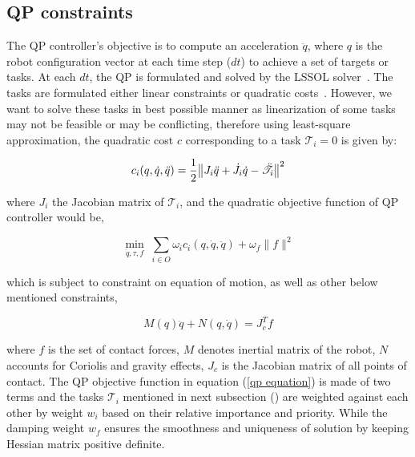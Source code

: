 \subsection{QP constraints}\label{QPConstraints}

The QP controller's objective is to compute an acceleration $\ddot{q}$, where $q$ is the robot configuration vector at each time step ($dt$)  to achieve a set of targets or tasks. At each $dt$, the QP is formulated and solved by the LSSOL solver~\cite{gill1986fortran}. The tasks are formulated either linear constraints or quadratic costs~\cite{ladder-HRP-2Kai}. However, we want to solve these tasks in best possible manner as linearization of some tasks may not be feasible or may be conflicting, therefore using least-square approximation, the quadratic cost $c$ corresponding to a task $\mathscr{T}_i =0$ is given by:



\begin{equation}
c_i(q,\dot{q}, \ddot{q})  = \frac{1}{2}{\norm{ J_i\ddot{q} + \dot{J}_i\dot{q} -\ddot{\mathscr{T}}_i }^2 }
\end{equation}

where $J_i$ the Jacobian matrix of $\mathscr{T}_i$, and the quadratic objective function of QP controller would be,

\begin{equation}\label{qp equation}
\min_{\ddot{q},\tau,f} \; \sum_{i\in O} \omega_i c_i(q,\dot{q},\ddot{q}) + \omega_{f}\lVert f\rVert^2
\end{equation}

which is subject to constraint on equation of motion, as well as other below mentioned constraints,

\begin{equation}
	M(q)\ddot{q} + N(q,\dot{q}) =  J_c^T f
\end{equation}

where $f$ is the set of contact forces, $M$ denotes inertial matrix of the robot, $N$ accounts for Coriolis  and gravity effects, $J_c$ is the Jacobian matrix of all points of contact. The QP objective function in equation (\ref{qp equation}) is made of two terms and the tasks $\mathscr{T}_i$ mentioned in next subsection () are weighted against each other by weight $w_i$ based on their relative importance and priority. While the damping weight $w_f$ ensures the smoothness and uniqueness of solution by keeping Hessian matrix positive definite.

